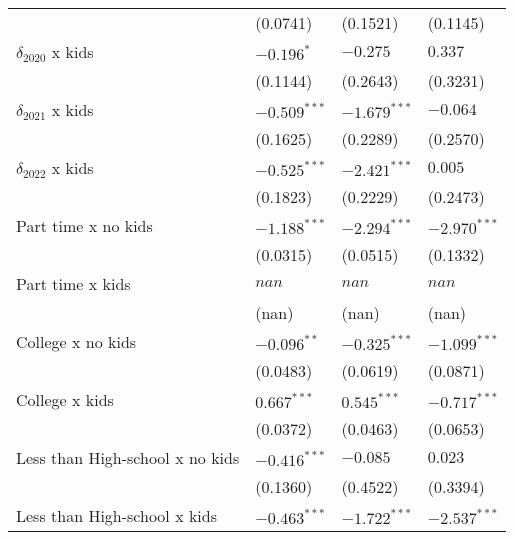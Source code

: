 \begin{tabular}{llll}
                                        &           (0.0741) &           (0.1521) &           (0.1145) \\
$\delta_{2020}$ x kids                  &         $-0.196^*$ &           $-0.275$ &            $0.337$ \\
                                        &           (0.1144) &           (0.2643) &           (0.3231) \\
$\delta_{2021}$ x kids                  &     $-0.509^{***}$ &     $-1.679^{***}$ &           $-0.064$ \\
                                        &           (0.1625) &           (0.2289) &           (0.2570) \\
$\delta_{2022}$ x kids                  &     $-0.525^{***}$ &     $-2.421^{***}$ &            $0.005$ \\
                                        &           (0.1823) &           (0.2229) &           (0.2473) \\
Part time x no kids                     &     $-1.188^{***}$ &     $-2.294^{***}$ &     $-2.970^{***}$ \\
                                        &           (0.0315) &           (0.0515) &           (0.1332) \\
Part time x kids                        &              $nan$ &              $nan$ &              $nan$ \\
                                        &              (nan) &              (nan) &              (nan) \\
College x no kids                       &      $-0.096^{**}$ &     $-0.325^{***}$ &     $-1.099^{***}$ \\
                                        &           (0.0483) &           (0.0619) &           (0.0871) \\
College x kids                          &      $0.667^{***}$ &      $0.545^{***}$ &     $-0.717^{***}$ \\
                                        &           (0.0372) &           (0.0463) &           (0.0653) \\
Less than High-school x no kids         &     $-0.416^{***}$ &           $-0.085$ &            $0.023$ \\
                                        &           (0.1360) &           (0.4522) &           (0.3394) \\
Less than High-school x kids            &     $-0.463^{***}$ &     $-1.722^{***}$ &     $-2.537^{***}$ \\

\end{tabular}
